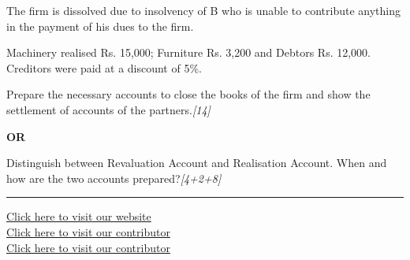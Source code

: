 \documentclass[11pt,a4paper]{article}
\newcommand{\pts}[1]{\hfill   \textit{[#1]}}
\begin{document}
The firm is dissolved due to insolvency of B who is unable to contribute anything in the payment of his dues to the firm.

Machinery realised Rs. 15,000; Furniture Rs. 3,200 and Debtors Rs. 12,000. Creditors were paid at a discount of 5\%.

Prepare the necessary accounts to close the books of the firm and show the settlement of accounts of the partners.\pts{14}

\centerline{   \textbf{OR}}

Distinguish between Revaluation Account and Realisation Account. When and how are the two accounts prepared?\pts{4+2+8}

\vfill
\rule{\linewidth}{0.4pt}

\begin{center}\small
\href{https://bhu-exam.vercel.app/}{Click here to visit our website}\\[4pt]
\href{https://me-aryan.vercel.app/}{Click here to visit our contributor}\\[4pt]
\href{https://quashan-me.vercel.app/}{Click here to visit our contributor}
\end{center}
\end{document}
